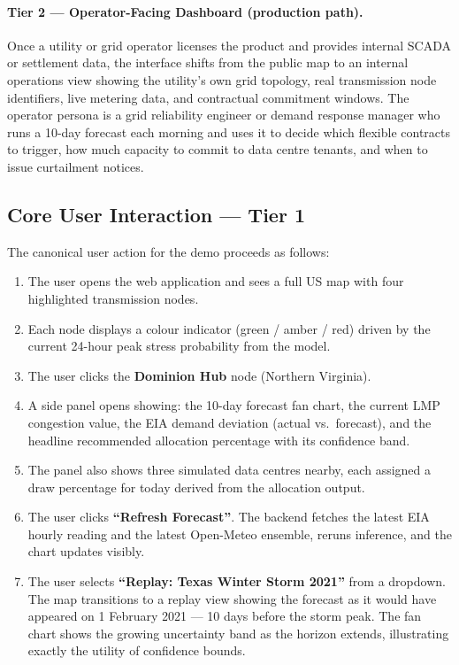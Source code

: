 \documentclass[10pt,letterpaper]{article}
\begin{document}
\paragraph{Tier 2 --- Operator-Facing Dashboard (production path).}
Once a utility or grid operator licenses the product and provides internal SCADA or
settlement data, the interface shifts from the public map to an internal operations view
showing the utility's own grid topology, real transmission node identifiers, live
metering data, and contractual commitment windows. The operator persona is a grid
reliability engineer or demand response manager who runs a 10-day forecast each morning
and uses it to decide which flexible contracts to trigger, how much capacity to commit to
data centre tenants, and when to issue curtailment notices.

\subsection{Core User Interaction --- Tier 1}

The canonical user action for the demo proceeds as follows:

\begin{enumerate}[leftmargin=*, label=\arabic*.]
  \item The user opens the web application and sees a full US map with four highlighted
        transmission nodes.
  \item Each node displays a colour indicator (green / amber / red) driven by the
        current 24-hour peak stress probability from the model.
  \item The user clicks the \textbf{Dominion Hub} node (Northern Virginia).
  \item A side panel opens showing: the 10-day forecast fan chart, the current LMP
        congestion value, the EIA demand deviation (actual vs.\ forecast), and the
        headline recommended allocation percentage with its confidence band.
  \item The panel also shows three simulated data centres nearby, each assigned a
        draw percentage for today derived from the allocation output.
  \item The user clicks \textbf{``Refresh Forecast''}. The backend fetches the latest
        EIA hourly reading and the latest Open-Meteo ensemble, reruns inference, and
        the chart updates visibly.
  \item The user selects \textbf{``Replay: Texas Winter Storm 2021''} from a dropdown.
        The map transitions to a replay view showing the forecast as it would have
        appeared on 1 February 2021 --- 10 days before the storm peak. The fan chart
        shows the growing uncertainty band as the horizon extends, illustrating exactly
        the utility of confidence bounds.
\end{enumerate}
\end{document}
